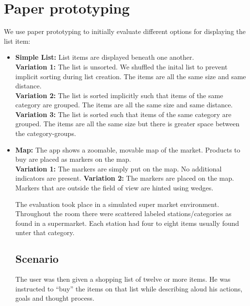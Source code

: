 \documentclass{article}
\begin{document}
\section{Paper prototyping}
We use paper prototyping to initially evaluate different options for displaying the list item:

\label{sec:list-types}
\begin{itemize}
    \item \textbf{Simple List:} List items are displayed beneath one another.\\
        \textbf{Variation 1:} The list is unsorted. We shuffled the inital list to prevent implicit sorting during list creation.
            The items are all the same size and same distance. \\
        \textbf{Variation 2:} The list is sorted implicitly such that items of the same category are grouped.
            The items are all the same size and same distance. \\
        \textbf{Variation 3:} The list is sorted such that items of the same category are grouped.
            The items are all the same size but there is greater space between the category-groups.
    \item \textbf{Map:} The app shows a zoomable, movable map of the market. Products to buy are placed as markers on the map. \\
        \textbf{Variation 1:} The markers are simply put on the map. No additional indicators are present.
        \textbf{Variation 2:} The markers are placed on the map. Markers that are outside the field of view are hinted using wedges. \cite{TODO}
\begin{itemize}


The evaluation took place in a simulated super market environment. 
Throughout the room there were scattered labeled stations/categories as found in a supermarket.
Each station had four to eight items usually found unter that category.

\subsection{Scenario}
The user was then given a shopping list of twelve or more items. 
He was instructed to ``buy'' the items on that list while describing aloud his actions, goals and thought process.


\end{itemize}
\end{itemize}
\end{document}
